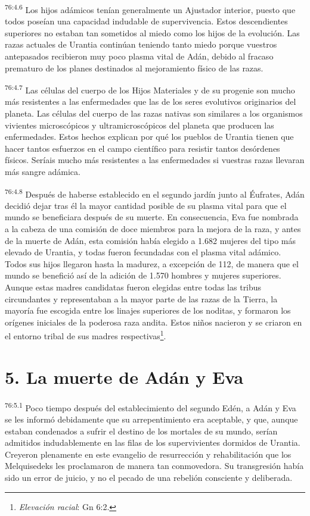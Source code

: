 \par
\textsuperscript{76:4.6} Los hijos adámicos tenían generalmente un Ajustador interior, puesto que todos poseían una capacidad indudable de supervivencia. Estos descendientes superiores no estaban tan sometidos al miedo como los hijos de la evolución. Las razas actuales de Urantia continúan teniendo tanto miedo porque vuestros antepasados recibieron muy poco plasma vital de Adán, debido al fracaso prematuro de los planes destinados al mejoramiento físico de las razas.

\par
\textsuperscript{76:4.7} Las células del cuerpo de los Hijos Materiales y de su progenie son mucho más resistentes a las enfermedades que las de los seres evolutivos originarios del planeta. Las células del cuerpo de las razas nativas son similares a los organismos vivientes microscópicos y ultramicroscópicos del planeta que producen las enfermedades. Estos hechos explican por qué los pueblos de Urantia tienen que hacer tantos esfuerzos en el campo científico para resistir tantos desórdenes físicos. Seríais mucho más resistentes a las enfermedades si vuestras razas llevaran más sangre adámica.

\par
\textsuperscript{76:4.8} Después de haberse establecido en el segundo jardín junto al Éufrates, Adán decidió dejar tras él la mayor cantidad posible de su plasma vital para que el mundo se beneficiara después de su muerte. En consecuencia, Eva fue nombrada a la cabeza de una comisión de doce miembros para la mejora de la raza, y antes de la muerte de Adán, esta comisión había elegido a 1.682 mujeres del tipo más elevado de Urantia, y todas fueron fecundadas con el plasma vital adámico. Todos sus hijos llegaron hasta la madurez, a excepción de 112, de manera que el mundo se benefició así de la adición de 1.570 hombres y mujeres superiores. Aunque estas madres candidatas fueron elegidas entre todas las tribus circundantes y representaban a la mayor parte de las razas de la Tierra, la mayoría fue escogida entre los linajes superiores de los noditas, y formaron los orígenes iniciales de la poderosa raza andita. Estos niños nacieron y se criaron en el entorno tribal de sus madres respectivas\footnote{\textit{Elevación racial}: Gn 6:2.}.

\section*{5. La muerte de Adán y Eva}
\par
\textsuperscript{76:5.1} Poco tiempo después del establecimiento del segundo Edén, a Adán y Eva se les informó debidamente que su arrepentimiento era aceptable, y que, aunque estaban condenados a sufrir el destino de los mortales de su mundo, serían admitidos indudablemente en las filas de los supervivientes dormidos de Urantia. Creyeron plenamente en este evangelio de resurrección y rehabilitación que los Melquisedeks les proclamaron de manera tan conmovedora. Su transgresión había sido un error de juicio, y no el pecado de una rebelión consciente y deliberada.

